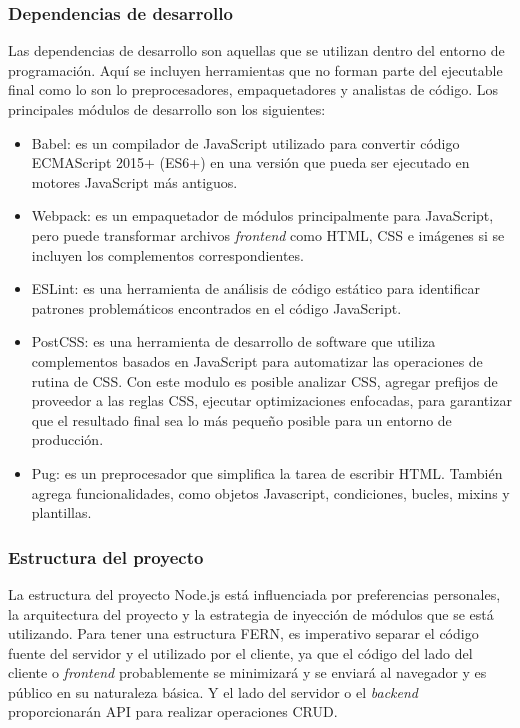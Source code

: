 \subsubsection{Dependencias de desarrollo}
Las dependencias de desarrollo son aquellas que se utilizan dentro del entorno de programación. Aquí se incluyen herramientas que no forman parte del ejecutable final como lo son lo preprocesadores, empaquetadores y analistas de código. Los principales módulos de desarrollo son los siguientes:
\begin{itemize}
  \item Babel: es un compilador de JavaScript utilizado para convertir código ECMAScript 2015+ (ES6+) en una versión que pueda ser ejecutado en motores JavaScript más antiguos.
  \item Webpack: es un empaquetador de módulos principalmente para JavaScript, pero puede transformar archivos \textit{frontend} como HTML, CSS e imágenes si se incluyen los complementos correspondientes.
  \item ESLint: es una herramienta de análisis de código estático para identificar patrones problemáticos encontrados en el código JavaScript.
  \item PostCSS: es una herramienta de desarrollo de software que utiliza complementos basados en JavaScript para automatizar las operaciones de rutina de CSS. Con este modulo es posible analizar CSS, agregar prefijos de proveedor a las reglas CSS, ejecutar optimizaciones enfocadas, para garantizar que el resultado final sea lo más pequeño posible para un entorno de producción.
  \item Pug: es un preprocesador que simplifica la tarea de escribir HTML. También agrega funcionalidades, como objetos Javascript, condiciones, bucles, mixins y plantillas.
\end{itemize}

\subsubsection{Estructura del proyecto}
La estructura del proyecto Node.js está influenciada por preferencias personales, la arquitectura del proyecto y la estrategia de inyección de módulos que se está utilizando. Para tener una estructura FERN, es imperativo separar el código fuente del servidor y el utilizado por el cliente, ya que el código del lado del cliente o \textit{frontend} probablemente se minimizará y se enviará al navegador y es público en su naturaleza básica. Y el lado del servidor o el \textit{backend} proporcionarán API para realizar operaciones CRUD.

